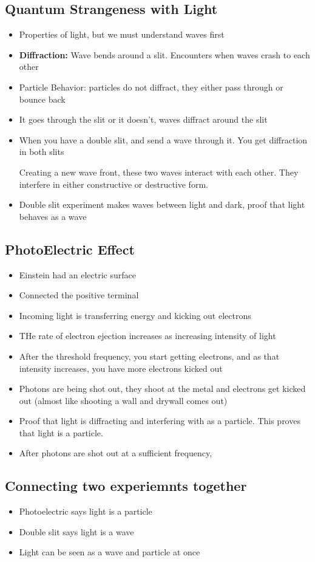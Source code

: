 \documentclass{article}
\begin{document}
\subsection{Quantum Strangeness with Light}

\begin{itemize}
  \item Properties of light, but we must understand waves first
  \item \textbf{Diffraction:} Wave bends around a slit. Encounters when waves crash to each other
  \item Particle Behavior: particles do not diffract, they either pass through or bounce back
  \item It goes through the slit or it doesn't, waves diffract around the slit
  \item When you have a double slit, and send a wave through it. You get diffraction in both slits

    Creating a new wave front, these two waves interact with each other. They interfere in either
    constructive or destructive form.
  \item Double slit experiment makes waves between light and dark, proof that light behaves as a wave
\end{itemize}

\subsection{PhotoElectric Effect}
\begin{itemize}
  \item Einstein had an electric surface
  \item Connected the positive terminal
  \item Incoming light is transferring energy and kicking out electrons
  \item THe rate of electron ejection increases as increasing intensity of light
  \item After the threshold frequency, you start getting electrons, and as that intensity
    increases, you have more electrons kicked out
  \item Photons are being shot out, they shoot at the metal and electrons get kicked out (almost like shooting a wall and drywall comes out)
  \item Proof that light is diffracting and interfering with as a particle.
    This proves that light is a particle.
  \item After photons are shot out at a sufficient frequency,
\end{itemize}

\subsection{Connecting two experiemnts together}
\begin{itemize}
  \item Photoelectric says light is a particle
  \item Double slit says light is a wave
  \item Light can be seen as a wave and particle at once
\end{itemize}
\end{document}
